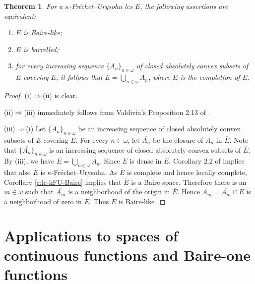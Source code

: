 \documentclass[preprint,11pt]{elsarticle}
\newtheorem{theorem}{Theorem}[section]
\theoremstyle{definition}
\theoremstyle{remark}
\numberwithin{equation}{section}
\numberwithin{theorem}{section}
\newcommand{\w}{\omega}
\newcommand{\Ra}{\Rightarrow}
\begin{document}
\begin{theorem} \label{t:kFU-Baire-like}
For a $\kappa$-Fr\'{e}chet--Urysohn lcs $E$, the following assertions are equivalent:
\begin{enumerate}
\item[{\rm(i)}] $E$ is Baire-like;
\item[{\rm(ii)}]  $E$ is barrelled;
\item[{\rm(iii)}] for every increasing sequence $\{A_n\}_{n\in\w}$ of closed absolutely convex subsets of $E$ covering $E$, it follows that  $\overline{E}=\bigcup_{n\in\w} \overline{A_n}$, where $\overline{E}$ is the completion of $E$.
\end{enumerate}
\end{theorem}

\begin{proof}
(i)$\Ra$(ii) is clear. %

(ii)$\Ra$(iii) immediately follows from Valdivia's Proposition 2.13 of \cite{kak}.

(iii)$\Ra$(i) Let $\{A_n\}_{n\in\w}$ be an increasing sequence of closed absolutely convex subsets of $E$ covering $E$. For every $n\in\w$, let $\overline{A_n}$ be the closure of $A_n$ in $\overline{E}$. Note that $\{\overline{A_n}\}_{n\in\w}$ is an increasing sequence of closed absolutely convex subsets of $\overline{E}$. By (iii), we have $\overline{E}=\bigcup_{n\in\w} \overline{A_n}$. Since $E$ is dense in $\overline{E}$, Corollary 2.2 of \cite{Gabr-B1} implies that also $\overline{E}$ is $\kappa$-Fr\'{e}chet--Urysohn. As $\overline{E}$ is complete and hence locally complete, Corollary \ref{c:lc-kFU-Baire} implies that $\overline{E}$ is a Baire space. Therefore there is an $m\in\w$ such that $\overline{A_m}$ is a neighborhood of the origin in $\overline{E}$. Hence $A_m=\overline{A_m}\cap E$ is a neighborhood of zero in $E$. Thus $E$ is Baire-like.
\end{proof}






\section{Applications to spaces of continuous functions and Baire-one functions} \label{sec:B1}
\end{document}
